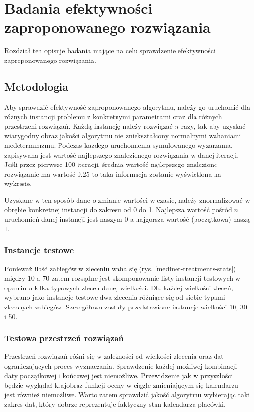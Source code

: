 \chapter{Badania efektywności zaproponowanego rozwiązania}
Rozdział ten opisuje badania mające na celu sprawdzenie efektywności
zaproponowanego rozwiązania.

\section{Metodologia}
Aby sprawdzić efektywność zaproponowanego algorytmu, należy go uruchomić dla różnych instancji problemu
z konkretnymi parametrami oraz dla różnych przestrzeni rozwiązań. Każdą instancję należy rozwiązać $n$ razy,
tak aby uzyskać wiarygodny obraz jakości algorytmu nie
zniekształcony normalnymi wahaniami niedeterminizmu. Podczas każdego uruchomienia symulowanego wyżarzania,
zapisywana jest wartość najlepszego znalezionego rozwiązania w danej iteracji. Jeśli przez pierwsze 100 iteracji,
średnia wartość najlepszego znalezione rozwiązanie ma wartość
$0.25$ to taka informacja zostanie wyświetlona na wykresie.

Uzyskane w ten sposób dane o zmianie wartości w czasie, należy
znormalizować w obrębie konkretnej instancji do zakresu od 0 do 1. Najlepsza wartość
pośród $n$ uruchomień danej instancji jest naszym 0 a najgorsza wartość
(początkowa) naszą 1.

\subsection{Instancje testowe}
Ponieważ ilość zabiegów w zleceniu waha się (rys. \ref{medinet-treatments-stats}) między 10 a 70
zatem rozsądne jest skomponowanie listy instancji testowych w oparciu o kilka
typowych zleceń danej wielkości. Dla każdej wielkości zleceń, wybrano jako
instancje testowe dwa zlecenia różniące się od siebie typami zleconych zabiegów.
Szczegółowo zostały przedstawione instancje wielkości 10, 30 i 50.
\newpage
\subsection{Testowa przestrzeń rozwiązań}
Przestrzeń rozwiązań różni się w zależności od wielkości zlecenia
oraz dat ograniczających proces wyznaczania. Sprawdzenie każdej
możliwej kombinacji daty początkowej i końcowej jest niemożliwe. Przewidzenie
jak w przyszłości będzie wyglądał krajobraz funkcji oceny w ciągle zmieniającym
się kalendarzu jest również niemożliwe. Warto zatem sprawdzić
jakość algorytmu wybierając taki zakres dat, który dobrze reprezentuje faktyczny
stan kalendarza placówki.

